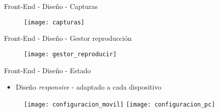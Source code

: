 \begin{frame}{Front-End - Diseño - Capturas}
  \begin{figure}
    \texttt{[image: capturas]}
  \end{figure}
\end{frame}

\begin{frame}{Front-End - Diseño - Gestor reproducción}
  \begin{figure}
    \texttt{[image: gestor\_reproducir]}
  \end{figure}
\end{frame}

\begin{frame}{Front-End - Diseño - Estado}
  \begin{itemize}
    \item Diseño \textit{responsive} - adaptado a cada dispositivo
  \end{itemize}
  \begin{figure}
    \texttt{[image: configuracion\_movil]}
    \hfill
    \texttt{[image: configuracion\_pc]}
  \end{figure}
\end{frame}
